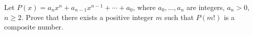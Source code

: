 Let $P(x) = a_n x^n + a_{n-1} x^{n-1} + \cdots + a_0$, where $a_0, \ldots, a_n$ are integers, $a_n > 0$, $n \geq 2$. Prove that there exists a positive integer $m$ such that $P(m!)$ is a composite number.
